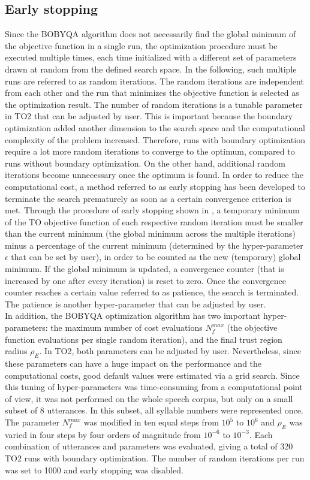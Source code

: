 \subsection{Early stopping}
Since the BOBYQA algorithm does not necessarily find the global minimum of the objective function in a single run, the optimization procedure must be executed multiple times, each time initialized with a different set of parameters drawn at random from the defined search space. In the following, such multiple runs are referred to as random iterations. The random iterations are independent from each other and the run that minimizes the objective function is selected as the optimization result. The number of random iterations is a tunable parameter in TO2 that can be adjusted by user. This is important because the boundary optimization added another dimension to the search space and the computational complexity of the problem increased. Therefore, runs with boundary optimization require a lot more random iterations to converge to the optimum, compared to runs without boundary optimization. On the other hand, additional random iterations become unnecessary once the optimum is found. In order to reduce the computational cost, a method referred to as early stopping has been developed to terminate the search prematurely as soon as a certain convergence criterion is met. Through the procedure of early stopping shown in \cite{TO2}, a temporary minimum of the TO objective function of each respective random iteration must be smaller than the current minimum (the global minimum across the multiple iterations) minus a percentage of the current minimum (determined by the hyper-parameter $\epsilon$ that can be set by user), in order to be counted as the new (temporary) global minimum. If the global minimum is updated, a convergence counter (that is increased by one after every iteration) is reset to zero. Once the convergence counter reaches a certain value referred to as patience, the search is terminated. The patience is another hyper-parameter that can be adjusted by user.\\
In addition, the BOBYQA optimization algorithm has two important hyper-parameters: the maximum number of cost evaluations $N_{f}^{max}$ (the objective function evaluations per single random iteration), and the final trust region radius $\rho_{E}$. In TO2, both parameters can be adjusted by user. Nevertheless, since these parameters can have a huge impact on the performance and the computational costs, good default values were estimated via a grid search. Since this tuning of hyper-parameters was time-consuming from a computational point of view, it was not performed on the whole speech corpus, but only on a small subset of 8 utterances. In this subset, all syllable numbers were represented once. The parameter $N_{f}^{max}$ was modified in ten equal steps from $10^5$ to $10^6$ and $\rho_{E}$ was varied in four steps by four orders of magnitude from $10^{-6}$ to $10^{-3}$. Each combination of utterances and parameters was evaluated, giving a total of 320 TO2 runs with boundary optimization. The number of random iterations per run was set to 1000 and early stopping was disabled.

